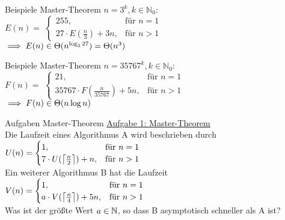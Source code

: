 \begin{frame}{Beispiele Master-Theorem}
	$n = 3^k, k \in \mathbb{N}_0$: \\[0,25cm]
	$E(n) = $ 
	\begin{math}
		\begin{cases}
		255,                            & \text{für } n = 1 \\
		27 \cdot E(\frac{n}{3}) + 3n,   & \text{für } n > 1
		\end{cases}
	\end{math} \\[0,5cm]
	\pause
	$\Impl E(n) \in \Theta(n^{\log _{3}27}) = \Theta(n^3)$
\end{frame}


\begin{frame}{Beispiele Master-Theorem}
	$n = 35767^k, k \in \mathbb{N}_0$: \\[0,25cm]
	$F(n) = $
	\begin{math}
		\begin{cases}
		21,                                   & \text{für } n = 1 \\
		35767 \cdot F(\frac{n}{35767}) + 5n,  & \text{für } n > 1
		\end{cases}
	\end{math} \\[0,5cm]
	\pause
	$\Impl F(n) \in \Theta(n\log n)$
\end{frame}


\begin{frame}{Aufgaben Master-Theorem}
	\underline{Aufgabe 1: Master-Theorem} \\
	Die Laufzeit eines Algorithmus A wird beschrieben durch \\[0,5cm]
	\begin{math}
		U(n) = 
		\begin{cases}
		1,                           			   & \text{für } n = 1 \\
		7 \cdot U(\left\lceil\frac{n}{2}\right\rceil) + n,  & \text{für } n > 1
		\end{cases} 
	\end{math} \\[0,5cm]
	Ein weiterer Algorithmus B hat die Laufzeit \\[0,5cm]
	\begin{math}
		V(n) = 
		\begin{cases}
		1,                            				& \text{für } n = 1 \\
		a \cdot V(\left\lceil\frac{n}{4}\right\rceil) + 5n,  & \text{für } n > 1
		\end{cases}
	\end{math} \\[0,5cm]
	Was ist der größte Wert $a \in \mathbb{N}$, so dass B asymptotisch schneller als A ist?
\end{frame}

